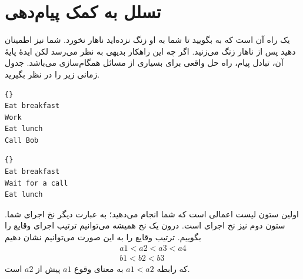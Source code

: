 \documentclass{book}
\newcommand{\clearemptydoublepage}{\newpage\cleardoublepage}
\begin{document}
\clearemptydoublepage
\section {تسلل به کمک پیام‌دهی}
\label{serialization}

    یک راه آن است که به  بگویید تا شما به او زنگ نزده‌اید ناهار نخورد. شما نیز  اطمینان دهید پس از ناهار زنگ می‌زنید. 
    اگر چه این راهکار بدیهی به نظر می‌رسد لکن ایدهٔ پایهٔ آن، تبادل پیام، راه حل واقعی برای بسیاری
    از مسائل همگام‌سازی می‌باشد.  جدول زمانی زیر را در نظر بگیرید. 
    
%
\begin{latin}
\begin{minipage}[t]{2in}
\begin{latin}
\begin{lstlisting}[title=\rl{نخ \lr{A} (شما)}]{}
Eat breakfast 
Work          
Eat lunch     
Call Bob
\end{lstlisting}
\end{latin}
\end{minipage}
\hfill
\begin{minipage}[t]{2in}
\begin{latin}
\begin{lstlisting}[title=\rl{نخ \lr{B} (‌Bob)}]{}
Eat breakfast
Wait for a call
Eat lunch
\end{lstlisting}
\end{latin}
\end{minipage}
\end{latin}
%
    اولین ستون لیست اعمالی است که شما انجام می‌دهید؛ به عبارت دیگر نخ اجرای شما. 
    ستون دوم نیز نخ اجرای  است. درون یک نخ همیشه می‌توانیم ترتیب اجرای وقایع را بگوییم. 
    ترتیب وقایع را به این صورت می‌توانیم نشان دهیم
%
\begin{eqnarray*}
a1 < a2 < a3 < a4  \\
b1 < b2 < b3
\end{eqnarray*}
%
    که رابطه  $a1 < a2$ به معنای وقوع  $a1$ پیش از  $a2$ است. 
\end{document}
